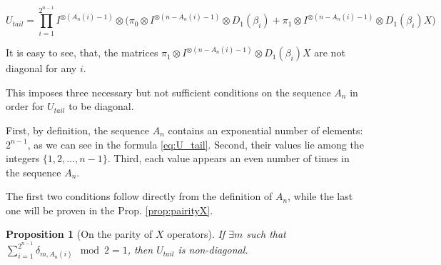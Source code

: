 \documentclass[a4paper, openany, 12pt]{article}
\newtheorem{prop}{Proposition}
\theoremstyle{remark}
\theoremstyle{definition}
\newcommand{\ot}{\otimes}
\begin{document}
\begin{equation}
    U_{tail} = \prod_{i=1}^{2^{n-1}} I^{\ot (A_n(i)-1)} \ot \biggl(\pi_0 \ot I^{\ot (n-A_n(i)-1)} \ot D_1(\beta_i) +
         \pi_1 \ot I^{\ot (n-A_n(i)-1)}\ot D_1(\beta_i)X \biggr)
    \label{eq:U_tail}
\end{equation}

It is easy to see, that, the matrices $\pi_1 \ot I^{\ot (n-A_n(i)-1)}\ot D_1(\beta_i)X$ are not diagonal for any $i$.

This imposes three necessary but not sufficient conditions on the sequence $A_n$ in order for $U_{tail}$ to be diagonal.

First, by definition, the sequence $A_n$ contains an exponential number of elements: $2^{n-1}$, as we can see in the formula \eqref{eq:U_tail}. Second, their values lie among the integers $\{1, 2, \dots, n-1\}$. Third, each value appears an even number of times in the sequence $A_n$.

The first two conditions follow directly from the definition of $A_n$, while the last one will be proven in the Prop. \ref{prop:pairityX}.


\begin{prop}[On the parity of $X$ operators\label{prop:pairityX}]
If $\exists m$ such that $\sum_{i=1}^{2^{n-1}}\delta_{m,A_n(i)} \mod 2 = 1$, then $U_{tail}$ is non-diagonal.
\end{prop}
\end{document}
